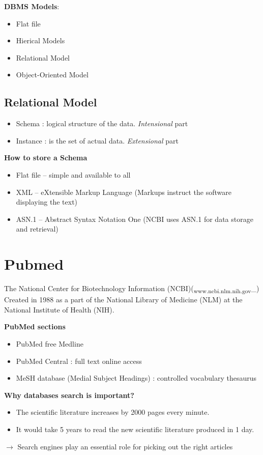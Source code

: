 \documentclass[11pt]{article}
\begin{document}
\textbf{DBMS Models}:
\begin{itemize}
\item Flat file
\item Hierical Models
\item Relational Model
\item Object-Oriented Model
\end{itemize}


\subsection{Relational Model}
\label{sec:orgfde49fd}
\begin{itemize}
\item Schema : logical structure of the data. \emph{Intensional} part
\item Instance : is the set of actual data. \emph{Extensional} part
\end{itemize}


\textbf{How to store a Schema}\\
\begin{itemize}
\item Flat file – simple and available to all
\item XML – eXtensible Markup Language (Markups instruct the software displaying the
text)
\item ASN.1 – Abstract Syntax Notation One (NCBI uses ASN.1 for data storage and
retrieval)
\end{itemize}



\section{Pubmed}
\label{sec:orgee5d967}
The National Center for Biotechnology Information (NCBI)(\textsubscript{www.ncbi.nlm.nih.gov}\_)
Created in 1988 as a part of the National Library of Medicine (NLM) at the
National Institute of Health (NIH).


\textbf{PubMed sections}\\
\begin{itemize}
\item PubMed free Medline
\item PubMed Central : full text online access
\item MeSH database (Medial Subject Headings) : controlled vocabulary thesaurus
\end{itemize}


\textbf{Why databases search is important?}\\
\begin{itemize}
\item The scientific literature increases by 2000 pages every minute.
\item It would take 5 years to read the new scientific literature produced in 1 day.
\end{itemize}
\(\rightarrow\) Search engines play an essential role for picking out the right articles
\end{document}
